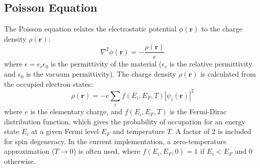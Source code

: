 \documentclass{article}
\begin{document}
\subsection{Poisson Equation}
The Poisson equation relates the electrostatic potential $\phi(\mathbf{r})$ to the charge density $\rho(\mathbf{r})$:
\begin{equation}
	\nabla^2 \phi(\mathbf{r}) = -\frac{\rho(\mathbf{r})}{\epsilon}
\end{equation}
where $\epsilon = \epsilon_r \epsilon_0$ is the permittivity of the material ($\epsilon_r$ is the relative permittivity and $\epsilon_0$ is the vacuum permittivity). The charge density $\rho(\mathbf{r})$ is calculated from the occupied electron states:
\begin{equation}
	\rho(\mathbf{r}) = -e \sum_i f(E_i, E_F, T) |\psi_i(\mathbf{r})|^2
\end{equation}
where $e$ is the elementary charge, and $f(E_i, E_F, T)$ is the Fermi-Dirac distribution function, which gives the probability of occupation for an energy state $E_i$ at a given Fermi level $E_F$ and temperature $T$. A factor of 2 is included for spin degeneracy. In the current implementation, a zero-temperature approximation ($T \to 0$) is often used, where $f(E_i, E_F, 0) = 1$ if $E_i < E_F$ and $0$ otherwise.
\end{document}
